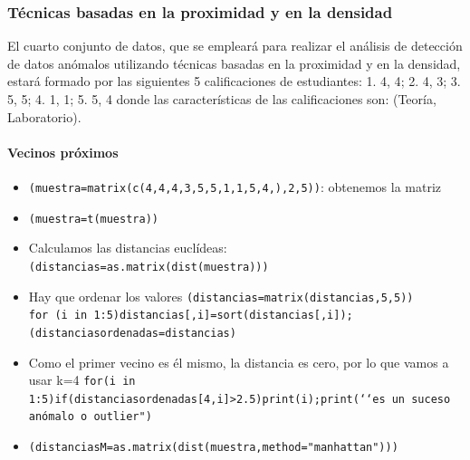 \documentclass[a4paper, 12pt]{article}
\begin{document}
	\subsubsection{Técnicas basadas en la proximidad y en la densidad}
	El cuarto conjunto de datos, que se empleará para realizar el análisis de detección de datos anómalos utilizando técnicas basadas en la proximidad y en la densidad, estará formado por las siguientes 5 calificaciones de estudiantes: 1. {4, 4}; 2. {4, 3}; 3. {5, 5}; 4. {1, 1}; 5. {5, 4} donde las características de las calificaciones son: (Teoría, Laboratorio).
	
	\paragraph{Vecinos próximos}
	\begin{itemize}
		\item \texttt{(muestra=matrix(c(4,4,4,3,5,5,1,1,5,4,),2,5))}: obtenemos la matriz
		\item \texttt{(muestra=t(muestra))}
		\item Calculamos las distancias euclídeas: \texttt{(distancias=as.matrix(dist(muestra)))}
		\item Hay que ordenar los valores \texttt{(distancias=matrix(distancias,5,5))}
		\\ \texttt{for (i in 1:5){distancias[,i]=sort(distancias[,i])}; (distanciasordenadas=distancias)}
		\item Como el primer vecino es él mismo, la distancia es cero, por lo que vamos a usar k=4 \texttt{for(i in 1:5){if(distanciasordenadas[4,i]>2.5){print(i);print(‘‘es un suceso anómalo o outlier")}}}
		\item \texttt{(distanciasM=as.matrix(dist(muestra,method="manhattan")))}
	\end{itemize}
	
\end{document}
